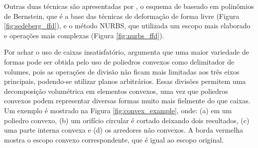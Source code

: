 Outras duas técnicas são apresentadas por , o esquema de  baseado em polinômios de Bernstein, que é a base das técnicas de deformação de forma livre (Figura \ref{fig:sedeberg_ffd}), e o método \gls{NURBS}, que utilizada um escopo mais elaborado e operações mais complexas (Figura \ref{fig:nurbs_ffd}).

\begin{figure}[h!]
	\centering
	\captionsetup{width=15cm}
	{}	
\end{figure}

\begin{figure}[h!]
	\centering
	\captionsetup{width=15cm}
	{}	
\end{figure}

Por achar o uso de caixas insatisfatório,  argumenta que uma maior variedade de formas pode ser obtida pelo uso de poliedros convexos como delimitador de volumes, pois as operações de divisão não ficam mais limitadas aos três eixos principais, podendo-se utilizar planos arbitrários. Essas divisões permitem uma decomposição volumétrica em elementos convexos, uma vez que poliedros convexos podem representar diversas formas muito mais fielmente do que caixas. Um exemplo é mostrado na Figura \ref{fig:convex_example}, onde: (a) em um poliedro convexo, (b) um orifício circular é cortado deixando dois resultados, (c) uma parte interna convexa e (d) os arredores não convexos. A borda vermelha mostra o escopo convexo correspondente, que é igual ao escopo original.


